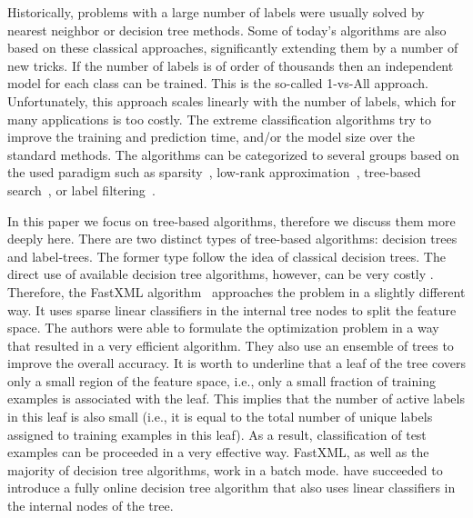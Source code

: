 \documentclass{article}
\begin{document}
Historically, problems with a large number of labels were usually solved by nearest neighbor or decision tree methods. Some of today's algorithms are also based on these classical approaches, significantly extending them by a number of new tricks. If the number of labels is of order of thousands then an independent model for each class can be trained. This is the so-called {1-vs-All} approach. Unfortunately, this approach scales linearly with the number of labels, which for many applications is too costly. The extreme classification algorithms try to improve the training and prediction time, and/or the model size over the standard methods. The algorithms can be categorized to several groups based on the used paradigm such as sparsity~\citep{Yen_et_al_2017,Babbar_Scholkopf_2017}, low-rank approximation~\cite{Mineiro_Karampatziakis_2015,Yu_et_al_2014,Bhatia_et_al_2015}, tree-based search~\citep{Prabhu_Varma_2014,Choromanska_Langford_2015,Jasinska_et_al_2016}, or label filtering~\citep{Cisse_et_al_2013,Vijayanarasimhan_et_al_2014,Shrivastava_Li_2015,Niculescu-Mizil_Abbasnejad_2017}.

In this paper we focus on tree-based algorithms, therefore we discuss them more deeply here. There are two distinct types of tree-based algorithms: decision trees and label-trees. The former type follow the idea of classical decision trees. The direct use of available decision tree algorithms, however, can be very costly \citep{Agrawal_et_al_2013}. Therefore, the FastXML algorithm~\citep{Prabhu_Varma_2014} approaches the problem in a slightly different way. It uses sparse linear classifiers in the internal tree nodes to split the feature space. The authors were able to formulate the optimization problem in a way that resulted in a very efficient algorithm. They also use an ensemble of trees to improve the overall accuracy. It is worth to underline that a leaf of the tree covers only a small region of the feature space, i.e., only a small fraction of training examples is associated with the leaf. This implies that the number of active labels in this leaf is also small (i.e., it is equal to the total number of unique labels assigned to training examples in this leaf). As a result, classification of test examples can be proceeded in a very effective way. FastXML, as well as the majority of decision tree algorithms, work in a batch mode. \citet{Choromanska_Langford_2015} have succeeded to introduce a fully online decision tree algorithm that also uses linear classifiers in the internal nodes of the tree.
\end{document}
